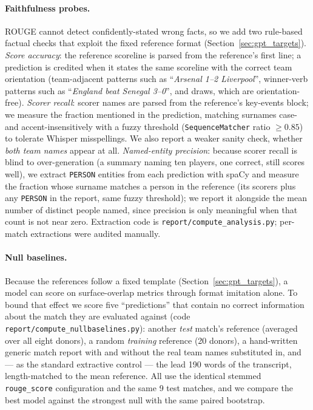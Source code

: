 \documentclass[10pt,a4paper]{article}
\begin{document}
\paragraph{Faithfulness probes.}
ROUGE cannot detect confidently-stated wrong facts, so we add two rule-based factual checks that exploit the fixed reference format (Section~\ref{sec:gpt_targets}). \emph{Score accuracy}: the reference scoreline is parsed from the reference's first line; a prediction is credited when it states the same scoreline with the correct team orientation (team-adjacent patterns such as ``\emph{Arsenal 1--2 Liverpool}'', winner-verb patterns such as ``\emph{England beat Senegal 3--0}'', and draws, which are orientation-free). \emph{Scorer recall}: scorer names are parsed from the reference's key-events block; we measure the fraction mentioned in the prediction, matching surnames case- and accent-insensitively with a fuzzy threshold (\texttt{SequenceMatcher} ratio $\ge 0.85$) to tolerate Whisper misspellings. We also report a weaker sanity check, whether \emph{both team names} appear at all. \emph{Named-entity precision}: because scorer recall is blind to over-generation (a summary naming ten players, one correct, still scores well), we extract \texttt{PERSON} entities from each prediction with spaCy and measure the fraction whose surname matches a person in the reference (its scorers plus any \texttt{PERSON} in the report, same fuzzy threshold); we report it alongside the mean number of distinct people named, since precision is only meaningful when that count is not near zero. Extraction code is \texttt{report/compute\_analysis.py}; per-match extractions were audited manually.

\paragraph{Null baselines.}
Because the references follow a fixed template (Section~\ref{sec:gpt_targets}), a model can score on surface-overlap metrics through format imitation alone. To bound that effect we score five ``predictions'' that contain no correct information about the match they are evaluated against (code \texttt{report/compute\_nullbaselines.py}): another \emph{test} match's reference (averaged over all eight donors), a random \emph{training} reference (20 donors), a hand-written generic match report with and without the real team names substituted in, and --- as the standard extractive control --- the lead 190 words of the transcript, length-matched to the mean reference. All use the identical stemmed \texttt{rouge\_score} configuration and the same 9 test matches, and we compare the best model against the strongest null with the same paired bootstrap.
\end{document}
